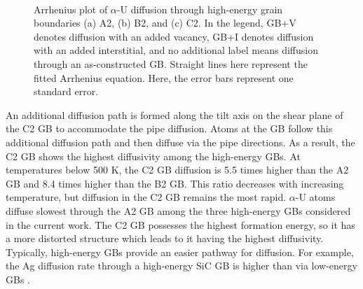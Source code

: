 \documentclass[review]{elsarticle}
\begin{document}
\begin{figure}[h!]
\centering
{}
\\
\caption{Arrhenius plot of $\alpha$-U diffusion through high-energy grain boundaries (a) A2, (b) B2, and (c) C2. In the legend, GB+V denotes diffusion with an added vacancy, GB+I denotes diffusion with an added interstitial, and no additional label means diffusion through an as-constructed GB. Straight lines here represent the fitted Arrhenius equation. Here, the error bars represent one standard error.}
\label{fig:Dif_fit2}
\end{figure}

An additional diffusion path is formed along the tilt axis on the shear plane of the C2 GB to accommodate the pipe diffusion. Atoms at the GB follow this additional diffusion path and then diffuse via the pipe directions. As a result, the C2 GB shows the highest diffusivity among the high-energy GBs. At temperatures below 500 K, the C2 GB diffusion is 5.5 times higher than the A2 GB and 8.4 times higher than the B2 GB. This ratio decreases with increasing temperature, but diffusion in the C2 GB remains the most rapid. $\alpha$-U atoms diffuse slowest through the A2 GB among the three high-energy GBs considered in the current work. The C2 GB possesses the highest formation energy, so it has a more distorted structure which leads to it having the highest diffusivity. Typically, high-energy GBs provide an easier pathway for diffusion. For example, the Ag diffusion rate through a high-energy SiC GB is higher than via low-energy GBs \cite{SiC_HE}.
\end{document}
